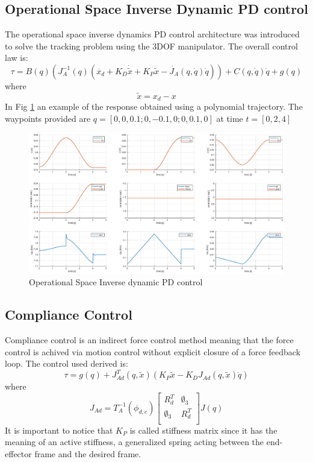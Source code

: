 \documentclass[a4paper,12pt]{article}
\begin{document}
\newpage
\subsection{Operational Space Inverse Dynamic PD control}

The operational space inverse dynamics PD control architecture was introduced to solve the tracking problem using the 3DOF manipulator. The overall control law is:
\[
    \tau = B(q)\left(J_{A}^{-1}(q)(\ddot{x_d}+K_D\dot{\tilde{x}}+K_P\tilde{x}-\dot{J_A}(q,\dot{q})\dot{q})\right)+ C(q,\dot{q})\dot{q} + g(q)
\]
where
\[
    \tilde{x} = x_d - x
\]
In Fig \ref{fig:op_inv_dyn} an example of the response obtained using a polynomial trajectory. The waypoints provided are $ q = [0,0,0.1;0,-0.1,0;0,0.1,0] $ at time $t = [ 0, 2, 4 ] $
\begin{figure}[H]
    \begin{center}
        \hspace*{-4.5cm}
        \includegraphics[scale=0.5]{images/op_inv_dyn.eps}
    \end{center}
    \caption{Operational Space Inverse dynamic PD control}
    \label{fig:op_inv_dyn}
\end{figure}

\newpage
\subsection{Compliance Control}
Compliance control is an indirect force control method meaning that the force control is achived via motion control without explicit closure of a force feedback loop. The control used derived is:
\[
    \tau = g(q) + J_{Ad}^T(q,\tilde{x})\left( K_P\tilde{x} - K_DJ_{Ad} (q,\tilde{x})\dot{q}\right)
\]
where
\[
    J_{Ad} = T_A^{-1}(\phi_{d,e})\begin{bmatrix}
        R_d^T & \emptyset_3 \\ 
    \emptyset_3 &     R_d^T \\
    \end{bmatrix} J(q)
\]
It is important to notice that $K_P$ is called stiffness matrix since it has the meaning of an active stiffness, a generalized spring acting between the end-effector frame and the desired frame.
\end{document}
